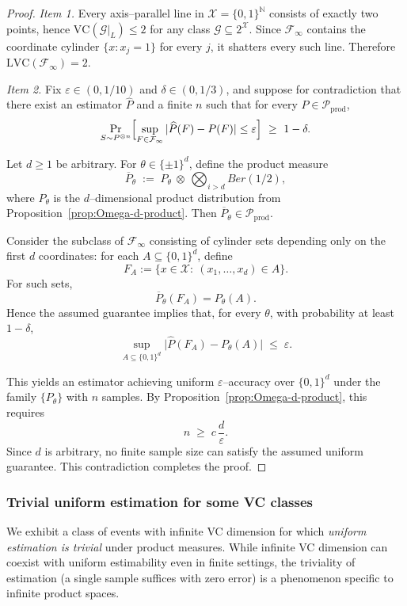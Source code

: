 \documentclass[arxiv]{colt2026}
\newcommand{\X}{\mathcal{X}}
\newcommand{\F}{\mathcal{F}}
\newcommand{\G}{\mathcal{G}}
\newcommand{\Pc}{\mathcal{P}}
\newcommand{\Ber}{Ber}
\newcommand{\eps}{\varepsilon}
\newcommand{\VC}{\mathrm{VC}}
\newcommand{\LVC}{\mathrm{LVC}}
\begin{document}
\begin{proof}
\noindent\emph{Item 1.}
Every axis--parallel line in $\X=\{0,1\}^{\mathbb N}$ consists of exactly two
points, hence $\VC(\G|_L)\le 2$ for any class $\G\subseteq 2^\X$.
Since $\F_\infty$ contains the coordinate cylinder $\{x:x_j=1\}$ for every $j$,
it shatters every such line.
Therefore $\LVC(\F_\infty)=2$.

\medskip
\noindent\emph{Item 2.}
Fix $\eps\in(0,1/10)$ and $\delta\in(0,1/3)$, and suppose for contradiction that
there exist an estimator $\widehat P$ and a finite $n$ such that for every
$P\in\Pc_{\mathrm{prod}}$,
\[
\Pr_{S\sim P^{\otimes n}}
\Bigl[
\sup_{F\in\F_\infty}|\widehat P(F)-P(F)| \le \eps
\Bigr]\ \ge\ 1-\delta.
\]

Let $d\ge 1$ be arbitrary.
For $\theta\in\{\pm1\}^d$, define the product measure
\[
\overline P_\theta
\;:=\;
P_\theta \ \otimes\ \bigotimes_{i>d}\Ber(1/2),
\]
where $P_\theta$ is the $d$--dimensional product distribution from
Proposition~\ref{prop:Omega-d-product}.
Then $\overline P_\theta\in\Pc_{\mathrm{prod}}$.

Consider the subclass of $\F_\infty$ consisting of cylinder sets depending only
on the first $d$ coordinates:
for each $A\subseteq\{0,1\}^d$, define
\[
F_A := \{x\in\X:\ (x_1,\ldots,x_d)\in A\}.
\]
For such sets,
\[
\overline P_\theta(F_A)=P_\theta(A).
\]
Hence the assumed guarantee implies that, for every $\theta$, with probability
at least $1-\delta$,
\[
\sup_{A\subseteq\{0,1\}^d}
\bigl|\widehat P(F_A)-P_\theta(A)\bigr|
\;\le\;\eps.
\]

This yields an estimator achieving uniform $\eps$--accuracy over
$\{0,1\}^d$ under the family $\{P_\theta\}$ with $n$ samples.
By Proposition~\ref{prop:Omega-d-product}, this requires
\[
n \;\ge\; c\,\frac{d}{\eps}.
\]
Since $d$ is arbitrary, no finite sample size can satisfy the assumed uniform
guarantee.
This contradiction completes the proof.
\end{proof}





\subsubsection{Trivial uniform estimation for some VC classes}
We exhibit a class of events with infinite VC dimension for which
\emph{uniform estimation is trivial} under product measures.
While infinite VC dimension can coexist with uniform estimability even in
finite settings, the triviality of estimation (a single sample suffices with
zero error) is a phenomenon specific to infinite product spaces.
\end{document}
